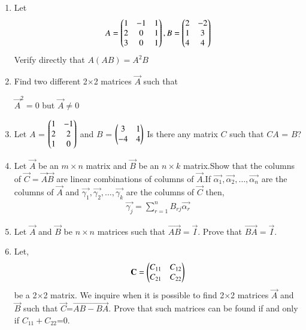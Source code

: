 \renewcommand{\theequation}{\theenumi}
\renewcommand{\thefigure}{\theenumi}
\begin{enumerate}[label=\thesubsection.\arabic*.,ref=\thesubsection.\theenumi]
%
\item Let
\begin{align}
   A=\begin{pmatrix}1&-1&1\\2&0&1\\3&0&1\end{pmatrix}, B=\begin{pmatrix}2&-2\\1&3\\4&4\end{pmatrix}
\end{align}
Verify directly that $ A(AB)=A^2B $
%
\solution

%

%
\item Find two different 2$\times$2 matrices $\vec{A}$ such that 

$\vec{A}^{2}=0$ but $\vec{A}\ne0$
%
\\
\solution

%
\item Let $A$ = $\begin{pmatrix}1 & -1\\2 & 2\\1 & 0\end{pmatrix}$ and $B$ = $\begin{pmatrix}3 & 1\\-4 & 4\end{pmatrix}$
Is there any matrix $C$ such that $CA$ = $B$?
\\
\solution

\item Let $\vec{A}$ be an $m \times n$ matrix and $\vec{B}$ be an $n \times k$ matrix.Show that the columns of $\vec{C}=\vec{A}\vec{B}$ are linear combinations of columns of $\vec{A}$.If $\vec{\alpha_1},\vec{\alpha_2},\hdots,\vec{\alpha_n}$ are the columns of $\vec{A}$ and $\vec{\gamma_1},\vec{\gamma_2},\hdots,\vec{\gamma_k}$ are the columns of $\vec{C}$ then,
\begin{align}
    \vec{\gamma_j}= \sum_{r=1}^{n}B_{rj}\vec{\alpha_r} 
\end{align}
%
\solution

%
\item Let $\vec{A}$ and $\vec{B}$ be $n \times n$ matrices such that $\vec{AB}=\vec{I}$. Prove that $\vec{BA}=\vec{I}$.
%
\solution

%
\item Let,
\begin{align}
\mathbf{C}=\begin{pmatrix}C_{11}&C_{12}\\C_{21}&C_{22}\end{pmatrix}
\end{align}
be a 2$\times$2 matrix. We inquire when it is possible to find 2$\times$2 matrices $\vec{A}$ and $\vec{B}$ such that $\vec{C}$=$\vec{AB-BA}$. Prove that such matrices can be found if and only if $C_{11}+C_{22}$=0.
%
\solution



\end{enumerate}
